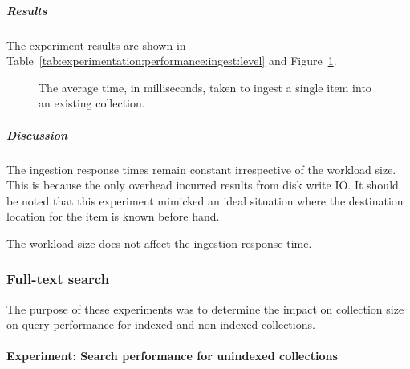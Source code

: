 \subparagraph{Results}

The experiment results are shown in Table~\ref{tab:experimentation:performance:ingest:level} and Figure~\ref{fig:experimentation:performance:ingest:plot.experimentation.performance.ingest.single-item}.

\tablespacing

\bodyspacing

\begin{figure}
 \centering
 \framebox[\textwidth]{%

 }
 \caption[Impact of structure on item ingestion performance]{The average time, in milliseconds, taken to ingest a single item into an existing collection.}
 \label{fig:experimentation:performance:ingest:plot.experimentation.performance.ingest.single-item}
\end{figure}

\subparagraph{Discussion}

The ingestion response times remain constant irrespective of the workload size. This is because the only overhead incurred results from disk write IO. It should be noted that this experiment mimicked an ideal situation where the destination location for the item is known before hand.


The workload size does not affect the ingestion response time.

\subsubsection{Full-text search}
\label{sec:evaluation:performance:search-and-browse}

The purpose of these experiments was to determine the impact on collection size on
query performance for indexed and non-indexed collections.

\paragraph{Experiment: Search performance for unindexed collections}
\label{sec:evaluation:performance:search-browse:experiment1}

